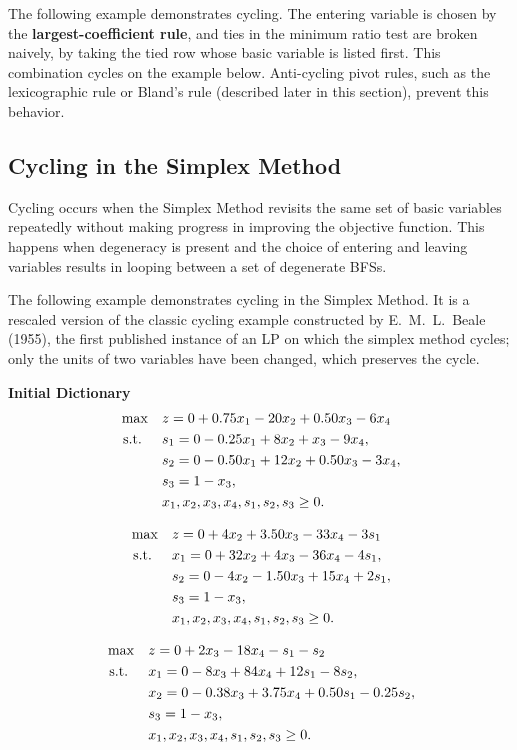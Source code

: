 The following example demonstrates cycling. The entering variable is chosen by the \textbf{largest-coefficient rule}, and ties in the minimum ratio test are broken naively, by taking the tied row whose basic variable is listed first. This combination cycles on the example below. Anti-cycling pivot rules, such as the lexicographic rule or Bland's rule (described later in this section), prevent this behavior.

\subsection{Cycling in the Simplex Method}
Cycling occurs when the Simplex Method revisits the same set of basic variables repeatedly without making progress in improving the objective function. This happens when degeneracy is present and the choice of entering and leaving variables results in looping between a set of degenerate BFSs.

The following example demonstrates cycling in the Simplex Method.  It is a rescaled version of the classic cycling example constructed by E.~M.~L.~Beale (1955), the first published instance of an LP on which the simplex method cycles; only the units of two variables have been changed, which preserves the cycle.

\textbf{Initial Dictionary}
\[
\begin{aligned}
\max \quad & z = 0 + 0.75x_1 - 20x_2 + 0.50x_3 - 6x_4 \\
\mbox{ s.t. } \quad 
& s_1 = 0 - 0.25x_1 + 8x_2 + x_3 - 9x_4, \\
& s_2 = 0 - 0.50x_1 + 12x_2 + 0.50x_3 - 3x_4, \\
& s_3 = 1 - x_3, \\
& x_1, x_2, x_3, x_4, s_1, s_2, s_3 \geq 0.
\end{aligned}
\]

\[
\begin{aligned}
\max \quad & z = 0 + 4x_2 + 3.50x_3 - 33x_4 - 3s_1 \\
\mbox{ s.t. } \quad 
& x_1 = 0 + 32x_2 + 4x_3 - 36x_4 - 4s_1, \\
& s_2 = 0 - 4x_2 - 1.50x_3 + 15x_4 + 2s_1, \\
& s_3 = 1 - x_3, \\
& x_1, x_2, x_3, x_4, s_1, s_2, s_3 \geq 0.
\end{aligned}
\]

\[
\begin{aligned}
\max \quad & z = 0 + 2x_3 - 18x_4 - s_1 - s_2 \\
\mbox{ s.t. } \quad 
& x_1 = 0 - 8x_3 + 84x_4 + 12s_1 - 8s_2, \\
& x_2 = 0 - 0.38x_3 + 3.75x_4 + 0.50s_1 - 0.25s_2, \\
& s_3 = 1 - x_3, \\
& x_1, x_2, x_3, x_4, s_1, s_2, s_3 \geq 0.
\end{aligned}
\]

